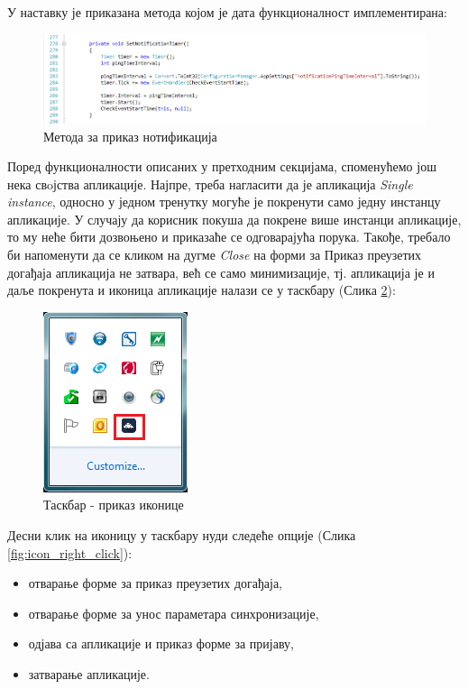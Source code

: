 У наставку је приказана метода којом је дата функционалност имплементирана:

\begin{figure}[H]
	\centering
	\includegraphics[scale=0.5]{slike/SetNotificationTimer.png}
	\caption{Метода за приказ нотификација}
	\label{fig:set_notification_timer}
\end{figure}

Поред функционалности описаних у претходним секцијама, споменућемо још нека свoјства апликације. Најпре, треба нагласити да је апликација \textit{Single instance}, односно у једном тренутку могуће је покренути само једну инстанцу апликације. У случају да корисник покуша да покрене више инстанци апликације, то му неће бити дозвоњено и приказаће се одговарајућа порука. 
Такође, требало би напоменути да се кликом на дугме \textit{Close} на форми за Приказ преузетих догађаја апликација не затвара, већ се само минимизације, тј. апликација је и даље покренута и иконица апликације налази се у таскбару (Слика \ref{fig:application_icon}):

\begin{figure}[H]
	\centering
	\includegraphics[scale=0.5]{slike/ApplicationIcon.png}
	\caption{Таскбар - приказ иконице}
	\label{fig:application_icon}
\end{figure}

Десни клик на иконицу у таскбару нуди следеће опције (Слика \ref{fig:icon_right_click}):
\begin{itemize}
	\item{отварање форме за приказ преузетих догађаја},
	\item{отварање форме за унос параметара синхронизације},
	\item{одјава са апликације и приказ форме за пријаву},
	\item{затварање апликације}.
\end{itemize}

